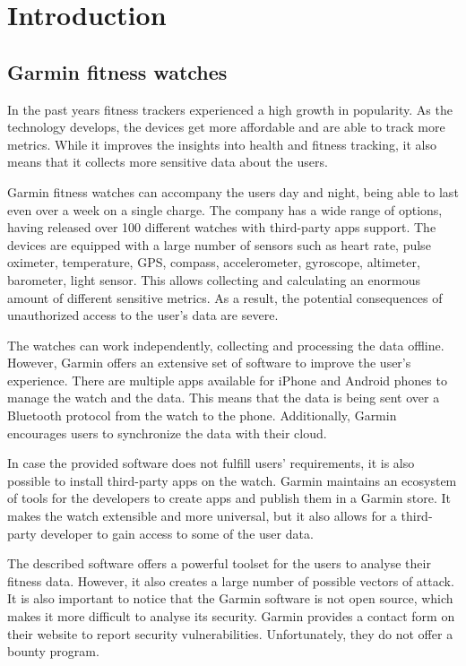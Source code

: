 \chapter{Introduction}


\section{Garmin fitness watches}

In the past years fitness trackers experienced a high growth in popularity.
As the technology develops, the devices get more affordable and are able to track more metrics.
While it improves the insights into health and fitness tracking, it also means that it collects more sensitive data about the users.

Garmin fitness watches can accompany the users day and night, being able to last even over a week on a single charge.
The company has a wide range of options, having released over 100 different watches with third-party apps support\cite{garmin-connect-iq-devices}.
The devices are equipped with a large number of sensors such as heart rate, pulse oximeter, temperature, GPS, compass, accelerometer, gyroscope, altimeter, barometer, light sensor.
This allows collecting and calculating an enormous amount of different sensitive metrics.
As a result, the potential consequences of unauthorized access to the user's data are severe.

The watches can work independently, collecting and processing the data offline.
However, Garmin offers an extensive set of software to improve the user's experience.
There are multiple apps available for iPhone and Android phones to manage the watch and the data.
This means that the data is being sent over a Bluetooth protocol from the watch to the phone.
Additionally, Garmin encourages users to synchronize the data with their cloud.

In case the provided software does not fulfill users' requirements, it is also possible to install third-party apps on the watch.
Garmin maintains an ecosystem of tools for the developers to create apps and publish them in a Garmin store.
It makes the watch extensible and more universal, but it also allows for a third-party developer to gain access to some of the user data.

The described software offers a powerful toolset for the users to analyse their fitness data.
However, it also creates a large number of possible vectors of attack.
It is also important to notice that the Garmin software is not open source, which makes it more difficult to analyse its security.
Garmin provides a contact form on their website to report security vulnerabilities.
Unfortunately, they do not offer a bounty program.

